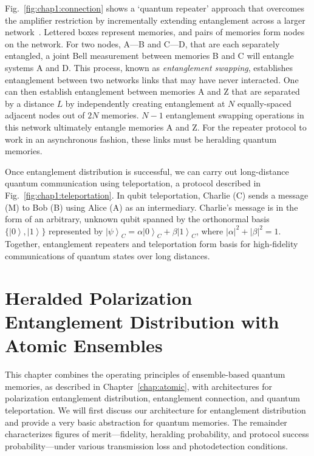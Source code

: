 \documentclass[aps,twocolumn,secnumarabic,amsmath,amssymb,pra,groupedaddress,
showpacs, showkeys]{revtex4-1}
\newcommand{\ket}[1]{\left|#1\right\rangle}
\newcommand{\abs}[1]{\left|#1\right|}
\begin{document}
Fig.~\ref{fig:chap1:connection} shows a `quantum repeater' approach that
overcomes the amplifier restriction by incrementally extending entanglement
across a larger network~\cite{2009arXiv0906.2699S}. Lettered boxes represent
memories, and pairs of memories form nodes on the network. For two nodes, A---B
and C---D, that are each separately entangled, a joint Bell measurement between
memories B and C will entangle systems A and D. This process, known as
\emph{entanglement swapping}, establishes entanglement between two networks
links that may have never interacted. One can then establish entanglement
between memories A and Z that are separated by a distance $L$ by independently
creating entanglement at $N$ equally-spaced adjacent nodes out of $2N$
memories. $N-1$ entanglement swapping operations in this network ultimately
entangle memories A and Z. For the repeater protocol to work in an asynchronous
fashion, these links must be heralding quantum memories.

Once entanglement distribution is successful, we can carry out long-distance
quantum communication using teleportation, a protocol described in
Fig.~\ref{fig:chap1:teleportation}. In qubit teleportation, Charlie (C) sends a
message (M) to Bob (B) using Alice (A) as an intermediary. Charlie's message is
in the form of an arbitrary, unknown qubit spanned by the orthonormal basis
$\{\ket{0},\ket{1}\}$ represented by $\ket{\psi}_C=\alpha
\ket{0}_C+\beta\ket{1}_C$, where $\abs{\alpha}^2+\abs{\beta}^2=1$. Together,
entanglement repeaters and teleportation form basis for high-fidelity
communications of quantum states over long distances.





\section{Heralded Polarization Entanglement Distribution with Atomic
  Ensembles\label{chap:herald}}

This chapter combines the operating principles of ensemble-based quantum
memories, as described in Chapter~\ref{chap:atomic}, with architectures for
polarization entanglement distribution, entanglement connection, and quantum
teleportation. We will first discuss our architecture for entanglement
distribution and provide a very basic abstraction for quantum memories. The
remainder characterizes figures of merit---fidelity, heralding probability, and
protocol success probability---under various transmission loss and
photodetection conditions.
\end{document}
